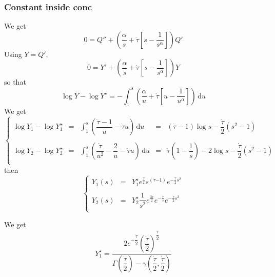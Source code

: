 \documentclass[11pt]{revtex4}
\begin{document}
\subsubsection{Constant inside conc}
We get
\begin{equation}
 0 = Q'' + \left( \dfrac{\alpha}{s} + \dot{\tau} \left[s-\dfrac{1}{s^\alpha}\right]\right) Q'
\end{equation}
Using $Y=Q'$,
\begin{equation}
	0 = Y' + \left( \dfrac{\alpha}{s} + \dot{\tau} \left[s-\dfrac{1}{s^\alpha}\right]\right) Y
\end{equation}
so that
\begin{equation}
	\log Y - \log Y^\star = -\int_{1}^s \left( \dfrac{\alpha}{u} + \dot{\tau} \left[u-\dfrac{1}{u^\alpha}\right]\right) \, \mathrm{d}u
\end{equation}
We get
\begin{equation}
\left\lbrace
\begin{array}{rclcl}
\log Y_1 - \log Y^\star_1 & = &\int_{1}^s \left( \dfrac{\dot{\tau}-1}{u} - \dot{\tau} u \right) \, \mathrm{d}u & = & (\dot{\tau}-1) \log s - \dfrac{\dot{\tau}}{2}(s^2-1)\\
\\
\log Y_2 - \log Y^\star_2 & = &\int_{1}^s \left( \dfrac{\dot{\tau}}{u^2} - \dfrac{2}{u} - \dot{\tau} u \right) \, \mathrm{d}u & = & \dot{\tau}\left(1-\dfrac{1}{s}\right)-2 \log s - \dfrac{\dot{\tau}}{2}(s^2-1)\\
\end{array}
\right.
\end{equation}
then
\begin{equation}
\left\lbrace
\begin{array}{rcl}
Y_1(s) & = & Y^\star_1 e^{\frac{\dot{\tau}}{2}} s^{(\dot{\tau}{-1})} e^{-\frac{\dot{\tau}}{2}s^2}\\
\\
Y_2(s) & = & Y^\star_2 \dfrac{1}{s^2} e^{\frac{3\dot{\tau}}{2}} e^{-\frac{\dot{\tau}}{s}} e^{-\frac{\dot{\tau}}{2}s^2}\\
\end{array}
\right.
\end{equation}

We get
\begin{equation}
	Y_1^\star = \dfrac{
		2e^{-\dfrac{\dot{\tau}}{2}}
		\left(\dfrac{\dot{\tau}}{2}\right)^{\dfrac{\dot{\tau}}{2}}
	}
	{\Gamma\left(\dfrac{\dot{\tau}}{2}\right)-\gamma\left(\dfrac{\dot{\tau}}{2},\dfrac{\dot{\tau}}{2}\right)}
\end{equation}
\end{document}
